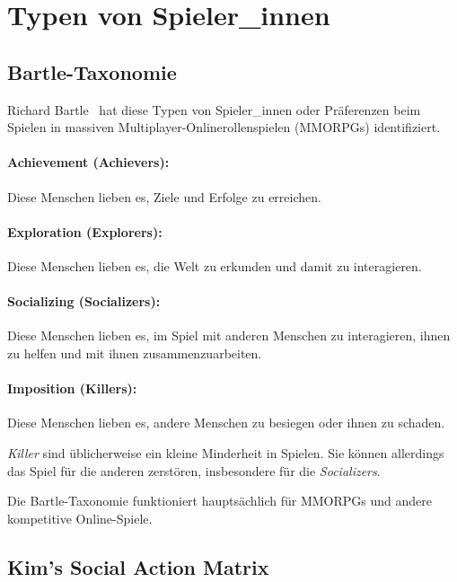 \section{Typen von Spieler\_innen}
\label{spielertypen}


\subsection{Bartle-Taxonomie}
\label{bartle-taxonomie}

Richard Bartle~\cite{bartle-taxonomy} hat diese Typen von Spieler\_innen oder Präferenzen beim Spielen in massiven Multiplayer-Onlinerollenspielen (MMORPGs) identifiziert.

\paragraph{Achievement (Achievers):} Diese Menschen lieben es, Ziele und Erfolge zu erreichen.
\paragraph{Exploration (Explorers):} Diese Menschen lieben es, die Welt zu erkunden und damit zu interagieren.
\paragraph{Socializing (Socializers):} Diese Menschen lieben es, im Spiel mit anderen Menschen zu interagieren, ihnen zu helfen und mit ihnen zusammenzuarbeiten.
\paragraph{Imposition (Killers):} Diese Menschen lieben es, andere Menschen zu besiegen oder ihnen zu schaden.

\emph{Killer} sind üblicherweise ein kleine Minderheit in Spielen. Sie können allerdings das Spiel für die anderen zerstören, insbesondere für die \emph{Socializers}.

Die Bartle-Taxonomie funktioniert hauptsächlich für MMORPGs und andere kompetitive Online-Spiele.


\subsection{Kim’s Social Action Matrix}
\label{kims-social-action-matrix}

